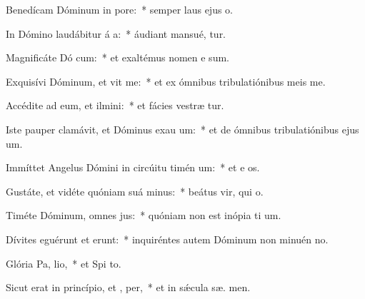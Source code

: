 \item Benedícam Dóminum in  pore:~* semper laus ejus   o.
\item In Dómino laudábitur á a:~* áudiant mansué,  tur.
\item Magnificáte Dó cum:~* et exaltémus nomen e  sum.
\item Exquisívi Dóminum, et vit me:~* et ex ómnibus tribulatiónibus meis  me.
\item Accédite ad eum, et ilmini:~* et fácies vestræ  tur.
\item Iste pauper clamávit, et Dóminus exau um:~* et de ómnibus tribulatiónibus ejus  um.
\item Immíttet Angelus Dómini in circúitu timén um:~* et e os.
\item Gustáte, et vidéte quóniam suá  minus:~* beátus vir, qui   o.
\item Timéte Dóminum, omnes  jus:~* quóniam non est inópia ti um.
\item Dívites eguérunt et erunt:~* inquiréntes autem Dóminum non minuén  no.
\item Glória Pa,  lio,~* et Spi to.
\item Sicut erat in princípio, et ,  per,~* et in sǽcula sæ. men.
